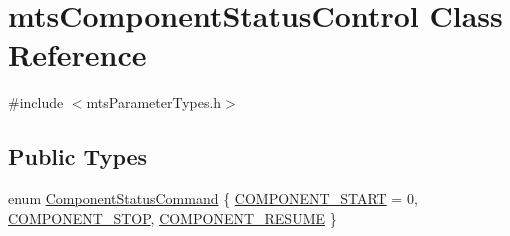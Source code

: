 \hypertarget{classmts_component_status_control}{}\section{mts\+Component\+Status\+Control Class Reference}
\label{classmts_component_status_control}


{\ttfamily \#include $<$mts\+Parameter\+Types.\+h$>$}

\subsection*{Public Types}
\begin{DoxyCompactItemize}
\item 
enum \hyperlink{classmts_component_status_control_aaa1cc592d13ddd45a5cf695f72d3511f}{Component\+Status\+Command} \{ \hyperlink{classmts_component_status_control_aaa1cc592d13ddd45a5cf695f72d3511faf5c069fdbe1a4bbe549cb03e6ccfa2dd}{C\+O\+M\+P\+O\+N\+E\+N\+T\+\_\+\+S\+T\+A\+R\+T} = 0, 
\hyperlink{classmts_component_status_control_aaa1cc592d13ddd45a5cf695f72d3511fa5f87b3e5181ea465b2a8b2551d0800a8}{C\+O\+M\+P\+O\+N\+E\+N\+T\+\_\+\+S\+T\+O\+P}, 
\hyperlink{classmts_component_status_control_aaa1cc592d13ddd45a5cf695f72d3511faffa0f81f25fcdcfff0ceb4d0a9214cec}{C\+O\+M\+P\+O\+N\+E\+N\+T\+\_\+\+R\+E\+S\+U\+M\+E}
 \}
\end{DoxyCompactItemize}
